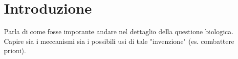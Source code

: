 

\chapter{Introduzione}


 Parla di come fosse imporante andare nel dettaglio della questione biologica. Capire sia i meccanismi sia i possibili usi di tale "invenzione" (es. combattere prioni).
 

\clearpage

